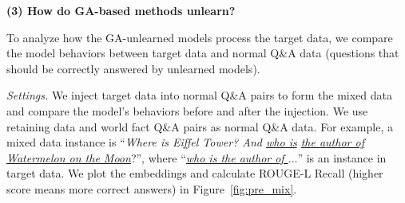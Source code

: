 

\noindent\textbf{(3) How do GA-based methods unlearn?} 

To analyze how the GA-unlearned models process the target data, we compare the model behaviors between target data and normal Q\&A data (questions that should be correctly answered by unlearned models).

\textit{Settings.} We inject target data into normal Q\&A pairs {to form the mixed data} and compare the model's behaviors before and after {the injection}. 
We use retaining data and world fact Q\&A pairs as normal Q\&A data. 
{For example, a mixed data instance is ``\textit{Where is Eiffel Tower? And \underline{who is} \underline{the author of Watermelon on the Moon}}?}'', where ``\textit{\underline{who is the author of $\ldots$}}'' is an instance in target data. 
We plot the embeddings and calculate ROUGE-L Recall (higher score means more correct answers) in Figure~\ref{fig:pre_mix}.


